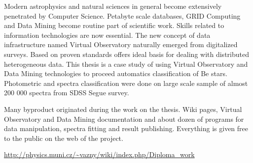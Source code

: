 


\begin{abstracts}        %


  Modern astrophysics and natural sciences in general become
  extensively penetrated by Computer Science. Petabyte scale
  databases, GRID Computing and Data Mining become routine part of
  scientific work. Skills related to information technologies are now
  essential. The new concept of data infrastructure named Virtual
  Observatory naturally emerged from digitalized surveys. Based on
  proven standards offers ideal basis for dealing with distributed
  heterogeneous data. This thesis is a case study of using Virtual
  Observatory and Data Mining technologies to proceed automatics
  classification of Be stars. Photometric and spectra classification
  were done on large scale sample of almost 200 000 spectra from SDSS
  Segue survey.

  Many byproduct originated during the work on the thesis. Wiki pages,
  Virtual Observatory and Data Mining documentation and about dozen of
  programs for data manipulation, spectra fitting and result
  publishing. Everything is given free to the public on the web of the
  project.


  \url{http://physics.muni.cz/~vazny/wiki/index.php/Diploma_work}

\end{abstracts}





